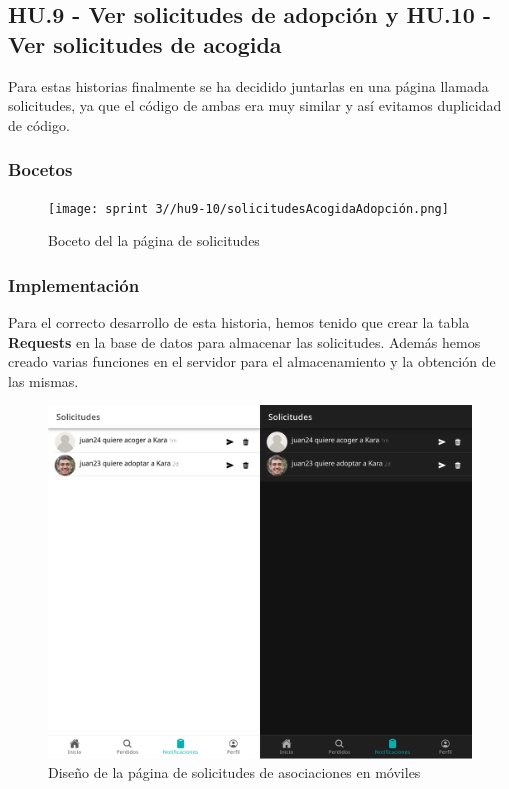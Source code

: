 \subsection{HU.9 - Ver solicitudes de adopción y HU.10 - Ver solicitudes de acogida}

Para estas historias finalmente se ha decidido juntarlas en una página llamada solicitudes, ya que el código de ambas era muy similar y así evitamos duplicidad de código. \\

\subsubsection{Bocetos}
\begin{figure}[H]
	\centering
	\texttt{[image: sprint 3//hu9-10/solicitudesAcogidaAdopción.png]}
	\caption{Boceto del la página de solicitudes}
	\label{fig:boceto_adopt}
\end{figure}


\subsubsection{Implementación}

Para el correcto desarrollo de esta historia, hemos tenido que crear la tabla \textbf{Requests} en la base de datos para almacenar las solicitudes. Además hemos creado varias funciones en el servidor para el almacenamiento y la obtención de las mismas.

\begin{figure} [H]
	\centering
	\includegraphics[width=1\linewidth]{sprint 3//hu9-10/solicitudes.png}
	\caption{Diseño de la página de solicitudes de asociaciones en móviles}
	\label{fig:notificaciones}
\end{figure}

